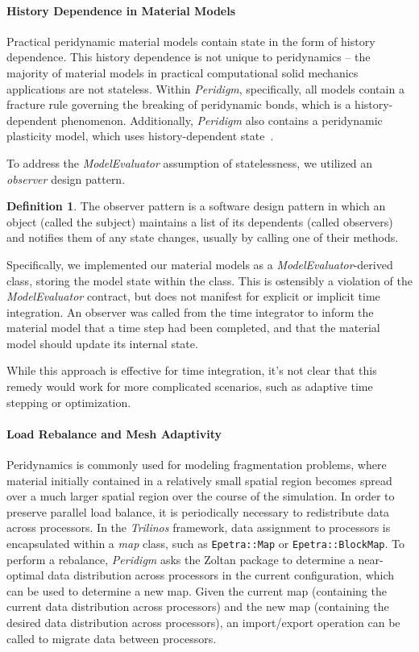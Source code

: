 \documentclass[pdf,ps2pdf,12pt,report]{SANDreport}
\theoremstyle{plain}
\theoremstyle{definition}
\newtheorem{defn}{Definition}[section]
\theoremstyle{remark}
\numberwithin{equation}{section}
\begin{document}
\paragraph{History Dependence in Material Models}

Practical peridynamic material models contain state in the form of history dependence. This history dependence is not unique to peridynamics -- the majority of material models in practical computational solid mechanics applications are not stateless. Within \emph{Peridigm}, specifically, all models contain a fracture rule governing the breaking of peridynamic bonds, which is a history-dependent phenomenon. Additionally, \emph{Peridigm} also contains a peridynamic plasticity model, which uses history-dependent state~\cite{Mitchell:2011:Plasticity}.

To address the \emph{ModelEvaluator} assumption of statelessness, we utilized an \emph{observer} design pattern.
\begin{defn}
The observer pattern is a software design pattern in which an object (called the subject) maintains a list of its dependents (called observers) and notifies them of any state changes, usually by calling one of their methods.
\end{defn}
\noindent
Specifically, we implemented our material models as a \emph{ModelEvaluator}-derived class, storing the model state within the class. This is ostensibly a violation of the \emph{ModelEvaluator} contract, but does not manifest for explicit or implicit time integration. An observer was called from the time integrator to inform the material model that a time step had been completed, and that the material model should update its internal state.

While this approach is effective for time integration, it's not clear that this remedy would work for more complicated scenarios, such as adaptive time stepping or optimization.

\paragraph{Load Rebalance and Mesh Adaptivity}

Peridynamics is commonly used for modeling fragmentation problems, where material initially contained in a relatively small spatial region becomes spread over a much larger spatial region over the course of the simulation. In order to preserve parallel load balance, it is periodically necessary to redistribute data across processors. In the \emph{Trilinos} framework, data assignment to processors is encapsulated within a \emph{map} class, such as \verb"Epetra::Map" or \verb"Epetra::BlockMap". To perform a rebalance, \emph{Peridigm} asks the Zoltan package to determine a near-optimal data distribution across processors in the current configuration, which can be used to determine a new map. Given the current map (containing the current data distribution across processors) and the new map (containing the desired data distribution across processors), an import/export operation can be called to migrate data between processors.
\end{document}
